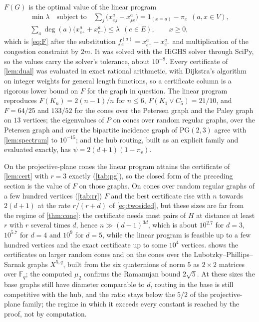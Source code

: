 \documentclass[11pt]{amsart}
\theoremstyle{definition}
\newcommand{\F}{\mathbb{F}}
\newcommand{\PG}{\mathrm{PG}}
\begin{document}
$F(G)$ is the optimal value of the linear program
\begin{gather*}
\min\lambda\quad\text{subject to}\quad \sum_j\bigl(x^a_{xj}-x^a_{jx}\bigr)=1_{(x=a)}-\pi_x\ \ (a,x\in V),\\
\sum_a\deg(a)\bigl(x^a_{e^+}+x^a_{e^-}\bigr)\le\lambda\ \ (e\in E),\qquad x\ge0,
\end{gather*}
which is \eqref{eq:F} after the substitution $f^{(a)}_e=x^a_{e^+}-x^a_{e^-}$ and multiplication of the congestion constraint by $2m$. It was solved with the HiGHS solver through SciPy, so the values carry the solver's tolerance, about $10^{-8}$. Every certificate of \cref{lem:dual} was evaluated in exact rational arithmetic, with Dijkstra's algorithm on integer weights for general length functions, so a certificate column is a rigorous lower bound on $F$ for the graph in question. The linear program reproduces $F(K_n)=2(n-1)/n$ for $n\le6$, $F(K_1\vee C_5)=21/10$, and $F=64/25$ and $133/52$ for the cones over the Petersen graph and the Paley graph on $13$ vertices; the eigenvalues of $P$ on cones over random regular graphs, over the Petersen graph and over the bipartite incidence graph of $\PG(2,3)$ agree with \cref{lem:spectrum} to $10^{-15}$; and the hub routing, built as an explicit family and evaluated exactly, has $\psi=2(d+1)(1-\pi_v)$.

On the projective-plane cones the linear program attains the certificate of \cref{lem:cert} with $r=3$ exactly (\cref{tab:pg}), so the closed form of the preceding section is the value of $F$ on those graphs. On cones over random regular graphs of a few hundred vertices (\cref{tab:rr}) $F$ and the best certificate rise with $n$ towards $2(d+1)$ at the rate $r/(r+d)$ of \eqref{eq:twosided}, but these sizes are far from the regime of \cref{thm:cone}: the certificate needs most pairs of $H$ at distance at least $r$ with $r$ several times $d$, hence $n\gg(d-1)^{3d}$, which is about $10^{2.7}$ for $d=3$, $10^{5.7}$ for $d=4$ and $10^9$ for $d=5$, while the linear program is feasible up to a few hundred vertices and the exact certificate up to some $10^4$ vertices.  shows the certificates on larger random cones and on the cones over the Lubotzky--Phillips--Sarnak graphs $X^{5,q}$, built from the six quaternions of norm $5$ as $2\times2$ matrices over $\F_q$; the computed $\mu_2$ confirms the Ramanujan bound $2\sqrt5$. At these sizes the base graphs still have diameter comparable to $d$, routing in the base is still competitive with the hub, and the ratio stays below the $5/2$ of the projective-plane family; the regime in which it exceeds every constant is reached by the proof, not by computation.
\end{document}
